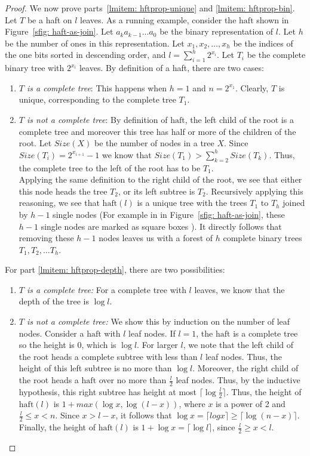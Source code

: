 \documentclass[11pt, letter]{article}
\newcommand{\haft}{\mathrm{haft}}
\begin{document}
\begin{proof}
We now prove parts~\ref{lmitem: hftprop-unique} and \ref{lmitem: hftprop-bin}. Let $T$ be a haft on $l$ leaves. As a
running example, consider the  $\haft$ shown in Figure~\ref{sfig: haft-as-join}.   Let $a_{k}a_{k-1}...a_{0}$ be the binary
representation of $l$. Let $h$ be the number of ones  in this representation. Let $x_{1}, x_{2}, \ldots, x_{h}$ be the
indices of the one bits sorted in descending order, and $l = \sum_{i=1}^{h} 2^{x_{i}}$. Let $T_{i}$ be the complete
binary tree with $2^{x_{i}}$ leaves. By definition of a haft, there are two cases:
\begin{enumerate}
\item  \emph{ $T$ is a complete tree}: This happens when $h=1$ and $n = 2^{x_{1}}$. Clearly, $T$ is unique, corresponding
to the complete tree $T_{1}$.
\item \emph{ $T$ is not a complete tree}: By definition of $\haft$, the left child of the root is a complete tree and
moreover this tree has half or more of the children of the root. Let $Size(X)$ be the number of nodes in a tree $X$.
Since $Size(T_{i}) =  2^{x_{i+1}} - 1$ we know that $Size(T_{1}) > \sum_{k=2}^{h} Size(T_{k}) $. Thus, the
complete tree to the left of the root has to be $T_{1}$. \\
 Applying the same definition to the right child of the root, we see that either this node heads the tree $T_{2}$, or
its left subtree is $T_{2}$. Recursively applying this reasoning,  we see that $\haft(l)$ is a unique tree with
the trees $T_{1}$ to $T_{h}$ joined by $h-1$ single nodes (For example in in Figure~\ref{sfig:
haft-as-join}, these $h-1$ single nodes are marked as square boxes ). It directly follows  that removing these $h-1$
nodes leaves us with a forest of $h$ complete binary trees $T_{1}, T_{2},\ldots T_{h}$.
\end{enumerate}



For part \ref{lmitem: hftprop-depth}, there are two possibilities:
 \begin{enumerate}
 \item \emph{$T$ is a complete tree:} For a complete tree with $l$ leaves, we know that the depth of the tree is $\log
l$.
\item \emph{$T$ is not a complete tree:} 
We show this by induction on the number of leaf nodes. Consider a $\haft$ with $l$ leaf nodes. If $l=1$, the $\haft$ is
a complete tree so the height is $0$, which is $\log l$. For larger $l$, we note that the left child of the root heads
a complete subtree with less than $l$ leaf nodes. Thus, the height of this left subtree is no more than $\log l$.
Moreover, the right child of the root heads a $\haft$ over no more than $\frac{l}{2}$ leaf nodes. Thus, by the
inductive hypothesis, this right subtree has height at most $\lceil \log\frac{l}{2} \rceil$. Thus, the height of
$\haft(l)$ is $1 + max(\log x, \log(l - x))$, where $x$ is a power of 2 and $\frac{l}{2} \le x < n$. Since $x > l- x$,
it follows that $\log x = \lceil log x \rceil \ge \lceil \log(n - x) \rceil$. Finally, the height of $\haft(l)$ is $1 +
\log x = \lceil\log l \rceil$, since $\frac{l}{2} \ge x < l$.


\end{enumerate}
\end{proof}
\end{document}

